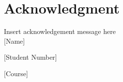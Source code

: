 \newpage
\chapter*{Acknowledgment}
\thispagestyle{empty}

Insert acknowledgement message here\\

[Name]

[Student Number]

[Course]
